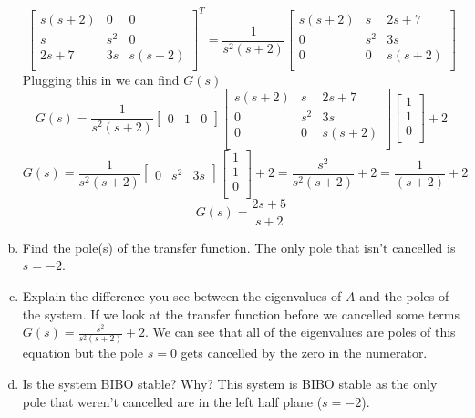\documentclass{article}
\begin{document}
\begin{enumerate}[a.]
$$\begin{bmatrix}
s(s+2) & 0   & 0 \\
s      & s^2 & 0 \\
2s+7   & 3s  & s(s+2) \\
\end{bmatrix}
^T
=
\frac{1}{s^2(s+2)}
\begin{bmatrix}
s(s+2) & s   & 2s+7 \\
0      & s^2 & 3s \\
0      & 0   & s(s+2) \\
\end{bmatrix}
$$
Plugging this in we can find $G(s)$
$$
G(s) =
\frac{1}{s^2(s+2)}
\begin{bmatrix} 0 & 1 & 0 \end{bmatrix}
\begin{bmatrix}
s(s+2) & s   & 2s+7 \\
0      & s^2 & 3s \\
0      & 0   & s(s+2) \\
\end{bmatrix}
\begin{bmatrix}
1 \\
1 \\
0 \\
\end{bmatrix}
+ 2
$$
$$
G(s) =
\frac{1}{s^2(s+2)}
\begin{bmatrix} 0 & s^2 & 3s \end{bmatrix}
\begin{bmatrix}
1 \\
1 \\
0 \\
\end{bmatrix}
+ 2
=
\frac{s^2}{s^2(s+2)} + 2
=
\frac{1}{(s+2)} + 2
$$
$$ G(s) = \frac{2s+5}{s+2} $$


\item Find the pole(s) of the transfer function.
\newline
The only pole that isn't cancelled is $s=-2$.

\item Explain the difference you see between the eigenvalues of $A$ and the poles of the system.
\newline
If we look at the transfer function before we cancelled some terms $G(s) = \frac{s^2}{s^2(s+2)} + 2 $.
We can see that all of the eigenvalues are poles of this equation but the pole $s=0$ gets cancelled by the zero in the numerator.

\item Is the system BIBO stable? Why?
\newline
This system is BIBO stable as the only pole that weren't cancelled are in the left half plane ($s=-2$).

\end{enumerate}
\end{document}
